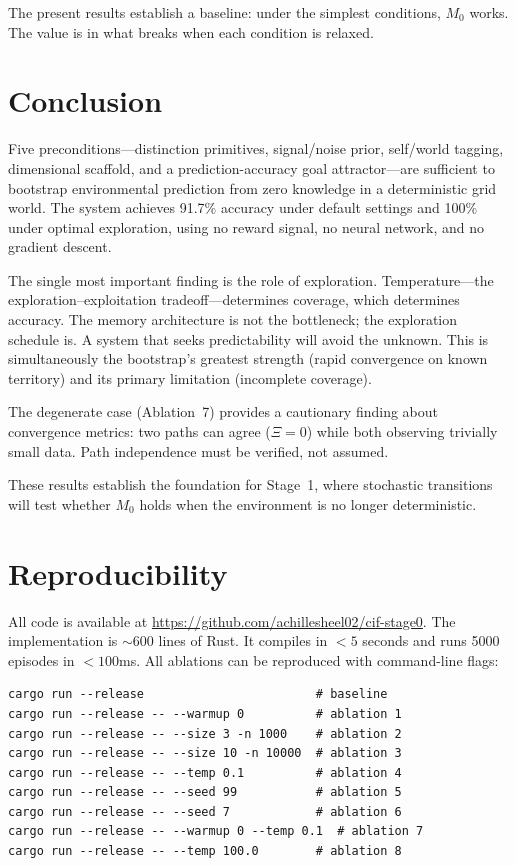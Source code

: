 \documentclass[11pt,a4paper]{article}
\begin{document}
The present results establish a baseline: under the simplest conditions, $M_0$ works. The value is in what breaks when each condition is relaxed.

\section{Conclusion}

Five preconditions---distinction primitives, signal/noise prior, self/world tagging, dimensional scaffold, and a prediction-accuracy goal attractor---are sufficient to bootstrap environmental prediction from zero knowledge in a deterministic grid world. The system achieves 91.7\% accuracy under default settings and 100\% under optimal exploration, using no reward signal, no neural network, and no gradient descent.

The single most important finding is the role of exploration. Temperature---the exploration--exploitation tradeoff---determines coverage, which determines accuracy. The memory architecture is not the bottleneck; the exploration schedule is. A system that seeks predictability will avoid the unknown. This is simultaneously the bootstrap's greatest strength (rapid convergence on known territory) and its primary limitation (incomplete coverage).

The degenerate case (Ablation~7) provides a cautionary finding about convergence metrics: two paths can agree ($\Xi = 0$) while both observing trivially small data. Path independence must be verified, not assumed.

These results establish the foundation for Stage~1, where stochastic transitions will test whether $M_0$ holds when the environment is no longer deterministic.

\section*{Reproducibility}

All code is available at \url{https://github.com/achillesheel02/cif-stage0}. The implementation is ${\sim}600$ lines of Rust. It compiles in $<5$ seconds and runs 5000 episodes in $<100$ms. All ablations can be reproduced with command-line flags:

\begin{lstlisting}
cargo run --release                        # baseline
cargo run --release -- --warmup 0          # ablation 1
cargo run --release -- --size 3 -n 1000    # ablation 2
cargo run --release -- --size 10 -n 10000  # ablation 3
cargo run --release -- --temp 0.1          # ablation 4
cargo run --release -- --seed 99           # ablation 5
cargo run --release -- --seed 7            # ablation 6
cargo run --release -- --warmup 0 --temp 0.1  # ablation 7
cargo run --release -- --temp 100.0        # ablation 8
\end{lstlisting}
\end{document}
